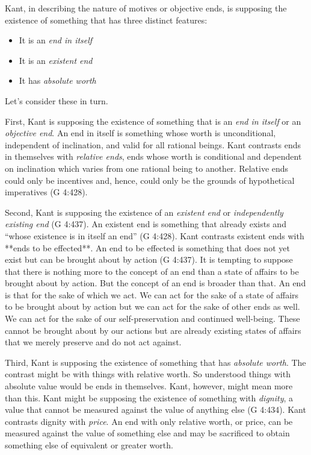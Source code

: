Kant, in describing the nature of motives or objective ends, is supposing the existence of something that has three distinct features:
\begin{itemize}
\item It is an \emph{end in itself}
\item It is an \emph{existent end}
\item It has \emph{absolute worth}
\end{itemize}

Let’s consider these in turn. \change

First, Kant is supposing the existence of something that is an \emph{end in itself} or an \emph{objective end}. An end in itself is something whose worth is unconditional, independent of inclination, and valid for all rational beings. Kant contrasts ends in themselves with \emph{relative ends}, ends whose worth is conditional and dependent on inclination which varies from one rational being to another. Relative ends could only be incentives and, hence, could only be the grounds of hypothetical imperatives (G 4:428). \change

Second, Kant is supposing the existence of an \emph{existent end} or \emph{independently existing end} (G 4:437). An existent end is something that already exists and ``whose existence is in itself an end'' (G 4:428). Kant contrasts existent ends with **ends to be effected**. An end to be effected is something that does not yet exist but can be brought about by action (G 4:437). It is tempting to suppose that there is nothing more to the concept of an end than a state of affairs to be brought about by action. But the concept of an end is broader than that. An end is that for the sake of which we act. We can act for the sake of a state of affairs to be brought about by action but we can act for the sake of other ends as well. We can act for the sake of our self-preservation and continued well-being. These cannot be brought about by our actions but are already existing states of affairs that we merely preserve and do not act against. \change

Third, Kant is supposing the existence of something that has \emph{absolute worth}. The contrast might be with things with relative worth. So understood things with absolute value would be ends in themselves. Kant, however, might mean more than this. Kant might be supposing the existence of something with \emph{dignity}, a value that cannot be measured against the value of anything else (G 4:434). Kant contrasts dignity with \emph{price}. An end with only relative worth, or price, can be measured against the value of something else and may be sacrificed to obtain something else of equivalent or greater worth.

